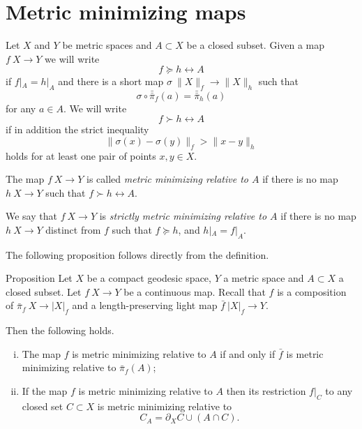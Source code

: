 \documentclass{article}
\begin{document}
\section{Metric minimizing maps}\label{Metric minimizing maps}

Let $X$ and $Y$ be metric spaces and $A\subset X$ be a closed subset.
Given a map $f\:X\to Y$
we will write 
\[f\succcurlyeq h\rel{A}\] 
if $f|_A=h|_A$ and there is a short map $\sigma\:\|X\|_f\to \|X\|_h$ 
such that 
\[\sigma\circ\bar{\bar\pi}_f(a)=\bar{\bar\pi}_h(a)\] for any $a\in A$.
We will write 
\[f\succ h\rel{A}\] 
if in addition the strict inequality
\[\|\sigma(x)-\sigma(y)\|_f>\|x-y\|_h\] 
holds for at least one pair of points $x,y\in X$.


The map $f\:X\to Y$ is called \emph{metric minimizing relative to $A$}
if there is no map $h\:X\to Y$ such that $f\succ h\rel{A}$.

We say that $f\:X\to Y$ is \emph{strictly metric minimizing relative to $A$}
if there is no map $h\:X\to Y$ distinct from $f$
such that $f\succcurlyeq h$, 
and $h|_A=f|_A$.

The following proposition follows directly from the definition.

\begin{thm}{Proposition}\label{prop:memicrit}
Let $X$ be a compact geodesic space, $Y$ a metric space 
and $A\subset X$ a closed subset.
Let $f\:X\to Y$ be a continuous map.
Recall that 
$f$ is a composition of $\bar\pi_f\: X\to|X|_f$ and a length-preserving light map $\bar f\:|X|_f\to Y$.

Then the following holds.
\begin{enumerate}[(i)]
\item\label{prop:memicrit:bar-f} The map $f$ is metric minimizing relative to $A$
if and only if $\bar f$ is metric minimizing relative to $\bar\pi_f(A)$;
\item\label{prop:memicrit:retriction} If the map $f$ is metric minimizing relative to $A$ then its restriction
$f|_C$ to any closed set $C\subset X$ is metric minimizing relative to 
\[C_A=\partial_X C\cup (A\cap C).\]
\end{enumerate}

\end{thm}


\end{document}
